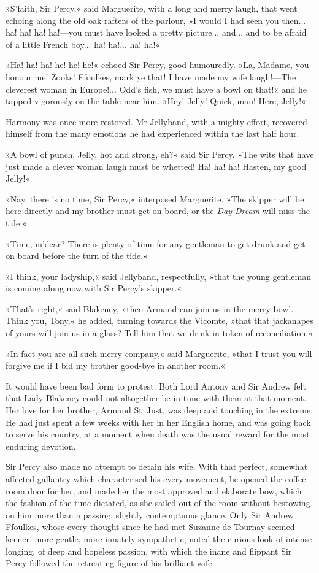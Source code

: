 »S'faith, Sir Percy,« said Marguerite, with a long and merry laugh, that went echoing along the old oak rafters of the parlour, »I would I had seen you then... ha! ha! ha! ha!\allowbreak---\allowbreak you must have looked a pretty picture... and... and to be afraid of a little French boy... ha! ha!... ha! ha!«

»Ha! ha! ha! he! he! he!« echoed Sir Percy, good-humouredly. »La, Madame, you honour me! Zooks!  Ffoulkes, mark ye that! I have made my wife laugh!\allowbreak---\allowbreak The cleverest woman in Europe!... Odd's fish, we must have a bowl on that!« and he tapped vigorously on the table near him. »Hey! Jelly! Quick, man! Here, Jelly!«

Harmony was once more restored. Mr Jellyband, with a mighty effort, recovered himself from the many emotions he had experienced within the last half hour.

»A bowl of punch, Jelly, hot and strong, eh?« said Sir Percy. »The wits that have just made a clever woman laugh must be whetted! Ha! ha! ha! Hasten, my good Jelly!«

»Nay, there is no time, Sir Percy,« interposed Marguerite. »The skipper will be here directly and my brother must get on board, or the \textit{Day Dream} will miss the tide.«

»Time, m'dear? There is plenty of time for any gentleman to get drunk and get on board before the turn of the tide.«

»I think, your ladyship,« said Jellyband, respectfully, »that the young gentleman is coming along now with Sir Percy's skipper.«

»That's right,« said Blakeney, »then Armand can join us in the merry bowl. Think you, Tony,« he added, turning towards the Vicomte, »that that jackanapes of yours will join us in a glass? Tell him that we drink in token of reconciliation.«

»In fact you are all such merry company,« said Marguerite, »that I trust you will forgive me if I bid my brother good-bye in another room.«

It would have been bad form to protest. Both Lord Antony and Sir Andrew felt that Lady Blakeney could not altogether be in tune with them at that moment. Her love for her brother, Armand St~Just, was deep and touching in the extreme. He had just spent a few weeks with her in her English home, and was going back to serve his country, at a moment when death was the usual reward for the most enduring devotion.

Sir Percy also made no attempt to detain his wife. With that perfect, somewhat affected gallantry which characterised his every movement, he opened the coffee-room door for her, and made her the most approved and elaborate bow, which the fashion of the time dictated, as she sailed out of the room without bestowing on him more than a passing, slightly contemptuous glance. Only Sir Andrew Ffoulkes, whose every thought since he had met Suzanne de Tournay seemed keener, more gentle, more innately sympathetic, noted the curious look of intense longing, of deep and hopeless passion, with which the inane and flippant Sir Percy followed the retreating figure of his brilliant wife.